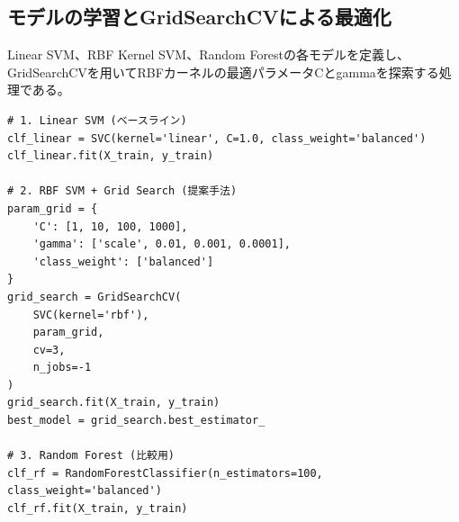 \documentclass[a4paper,11pt]{jsarticle}
\begin{document}
\subsection*{モデルの学習とGridSearchCVによる最適化}
Linear SVM、RBF Kernel SVM、Random Forestの各モデルを定義し、GridSearchCVを用いてRBFカーネルの最適パラメータCとgammaを探索する処理である。

\begin{lstlisting}[caption=識別器の学習と評価]
# 1. Linear SVM (ベースライン)
clf_linear = SVC(kernel='linear', C=1.0, class_weight='balanced')
clf_linear.fit(X_train, y_train)

# 2. RBF SVM + Grid Search (提案手法)
param_grid = {
    'C': [1, 10, 100, 1000],
    'gamma': ['scale', 0.01, 0.001, 0.0001],
    'class_weight': ['balanced']
}
grid_search = GridSearchCV(
    SVC(kernel='rbf'), 
    param_grid, 
    cv=3, 
    n_jobs=-1
)
grid_search.fit(X_train, y_train)
best_model = grid_search.best_estimator_

# 3. Random Forest (比較用)
clf_rf = RandomForestClassifier(n_estimators=100, class_weight='balanced')
clf_rf.fit(X_train, y_train)
\end{lstlisting}
\end{document}
